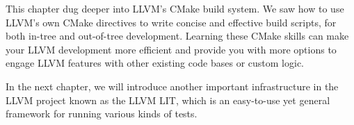 This chapter dug deeper into LLVM's CMake build system. We saw how to use LLVM's own CMake directives to write concise and effective build scripts, for both in-tree and out-of-tree development. Learning these CMake skills can make your LLVM development more efficient and provide you with more options to engage LLVM features with other existing code bases or custom logic.

In the next chapter, we will introduce another important infrastructure in the LLVM project known as the LLVM LIT, which is an easy-to-use yet general framework for running various kinds of tests.